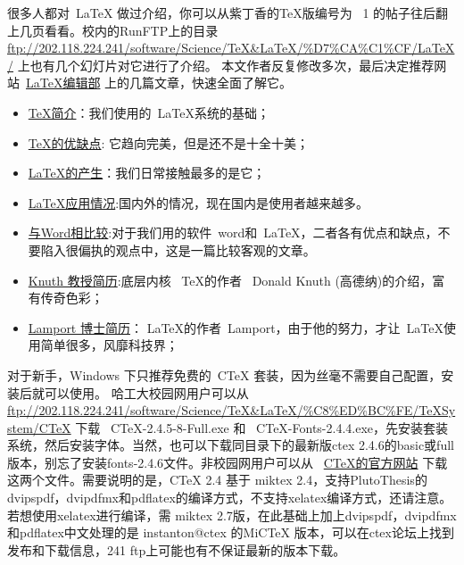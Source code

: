     很多人都对~\LaTeX{} 做过介绍，你可以从紫丁香的TeX版编号为~ 1 的帖子往后翻上几页看看。校内的RunFTP上的目录
    \url{ftp://202.118.224.241/software/Science/TeX&LaTeX/\%D7\%CA\%C1\%CF/LaTeX/} 上也有几个幻灯片对它进行了介绍。
    本文作者反复修改多次，最后决定推荐网站~\href{http://zzg34b.w3.c361.com/index.htm}{LaTeX编辑部} 上的几篇文章，快速全面了解它。
   \begin{itemize}
     \item  \href{http://learn.tsinghua.edu.cn:8080/2001315450/tex_frame.html}{TeX简介}：我们使用的~\LaTeX 系统的基础；
     \item \href{http://zzg34b.w3.c361.com/homepage/TeXvirtue.htm}{TeX的优缺点}: 它趋向完美，但是还不是十全十美；
     \item \href{http://zzg34b.w3.c361.com/homepage/LaTeXbring.htm}{LaTeX的产生}：我们日常接触最多的是它；
     \item \href{http://zzg34b.w3.c361.com/homepage/compareWord.htm}{LaTeX应用情况}:国内外的情况，现在国内是使用者越来越多。
     \item \href{http://zzg34b.w3.c361.com/homepage/compareWord.htm}{与Word相比较}:对于我们用的软件~word和~LaTeX，二者各有优点和缺点，不要陷入很偏执的观点中，这是一篇比较客观的文章。
     \item \href{http://zzg34b.w3.c361.com/homepage/KnuthResume.htm}{Knuth 教授简历}:底层内核~ \TeX 的作者~ Donald Knuth (高德纳)的介绍，富有传奇色彩；
     \item \href{http://zzg34b.w3.c361.com/homepage/LamportResume.htm}{Lamport 博士简历}： \LaTeX 的作者~Lamport，由于他的努力，才让~\LaTeX 使用简单很多，风靡科技界；
   \end{itemize}

\label{sec:latexsoftware}

对于新手，Windows 下只推荐免费的~CTeX 套装，因为丝毫不需要自己配置，安装后就可以使用。
哈工大校园网用户可以从~ \url{ftp://202.118.224.241/software/Science/TeX&LaTeX/\%C8\%ED\%BC\%FE/TeXSystem/CTeX} 下载~
CTeX-2.4.5-8-Full.exe 和~ CTeX-Fonts-2.4.4.exe，先安装套装系统，然后安装字体。当然，也可以下载同目录下的最新版ctex 2.4.6的basic或full
版本，别忘了安装fonts-2.4.6文件。非校园网用户可以从~ \href{http://www.ctex.org}{CTeX的官方网站} 下载这两个文件。需要说明的是，CTeX 2.4 基于 miktex 2.4，支持PlutoThesis的dvipspdf，dvipdfmx和pdflatex的编译方式，不支持xelatex编译方式，还请注意。若想使用xelatex进行编译，需 miktex 2.7版，在此基础上加上dvipspdf，dvipdfmx和pdflatex中文处理的是 instanton@ctex 的MiCTeX 版本，可以在ctex论坛上找到发布和下载信息，241 ftp上可能也有不保证最新的版本下载。


